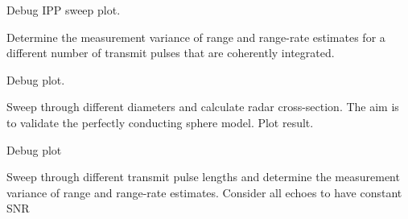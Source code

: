 \documentclass[letterpaper,10pt,english]{sphinxmanual}
\begin{document}

\begin{fulllineitems}
\label{\detokenize{modules/debris:debris.debug_ipp_sweep}}
Debug IPP sweep plot.

Determine the measurement variance of range and range-rate estimates
for a different number of transmit pulses that are coherently integrated.

\end{fulllineitems}


\begin{fulllineitems}
\label{\detokenize{modules/debris:debris.debug_rcs_sweep}}
Debug plot.

Sweep through different diameters and calculate radar cross-section. 
The aim is to validate the perfectly conducting sphere model. Plot result.

\end{fulllineitems}


\begin{fulllineitems}
\label{\detokenize{modules/debris:debris.debug_tx_len_sweep}}
Debug plot

Sweep through different transmit pulse lengths and determine
the measurement variance of range and range-rate estimates.
Consider all echoes to have constant SNR

\end{fulllineitems}
\end{document}
